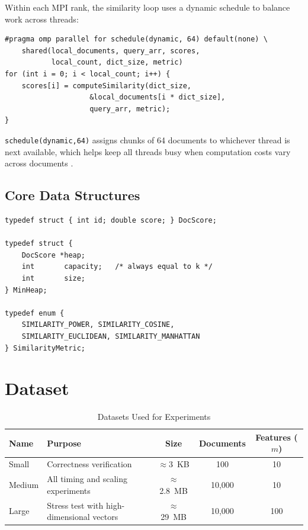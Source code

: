 \documentclass[12pt,a4paper]{article}
\begin{document}
Within each MPI rank, the similarity loop uses a dynamic schedule to
balance work across threads:

\begin{lstlisting}[caption={OpenMP parallel loop for similarity scoring}]
#pragma omp parallel for schedule(dynamic, 64) default(none) \
    shared(local_documents, query_arr, scores,
           local_count, dict_size, metric)
for (int i = 0; i < local_count; i++) {
    scores[i] = computeSimilarity(dict_size,
                    &local_documents[i * dict_size],
                    query_arr, metric);
}
\end{lstlisting}

\texttt{schedule(dynamic,64)} assigns chunks of 64 documents to
whichever thread is next available, which helps keep all threads busy
when computation costs vary across documents \cite{openmp51}.

\subsection{Core Data Structures}

\begin{lstlisting}[caption={Core type definitions from utils.h}]
typedef struct { int id; double score; } DocScore;

typedef struct {
    DocScore *heap;
    int       capacity;   /* always equal to k */
    int       size;
} MinHeap;

typedef enum {
    SIMILARITY_POWER, SIMILARITY_COSINE,
    SIMILARITY_EUCLIDEAN, SIMILARITY_MANHATTAN
} SimilarityMetric;
\end{lstlisting}

\clearpage
\section{Dataset}

\begin{table}[!htbp]
\centering
\small
\caption{Datasets Used for Experiments}
\label{tab:datasets}
\renewcommand{\arraystretch}{1.3}
\begin{tabular}{|l|p{4.5cm}|c|c|c|}
\hline
\textbf{Name} & \textbf{Purpose} &
\textbf{Size} & \textbf{Documents} & \textbf{Features ($m$)} \\
\hline
Small  & Correctness verification &
$\approx$3~KB   & 100    & 10 \\
\hline
Medium & All timing and scaling experiments &
$\approx$2.8~MB & 10,000 & 10 \\
\hline
Large  & Stress test with high-dimensional vectors &
$\approx$29~MB  & 10,000 & 100 \\
\hline
\end{tabular}
\end{table}
\end{document}
